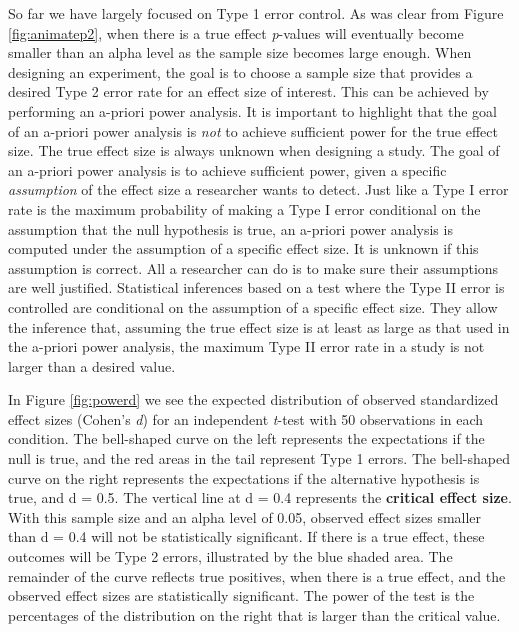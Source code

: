 \documentclass[
  oneside]{krantz}
\begin{document}
So far we have largely focused on Type 1 error control. As was clear from Figure \ref{fig:animatep2}, when there is a true effect \emph{p}-values will eventually become smaller than an alpha level as the sample size becomes large enough. When designing an experiment, the goal is to choose a sample size that provides a desired Type 2 error rate for an effect size of interest. This can be achieved by performing an a-priori power analysis. It is important to highlight that the goal of an a-priori power analysis is \emph{not} to achieve sufficient power for the true effect size. The true effect size is always unknown when designing a study. The goal of an a-priori power analysis is to achieve sufficient power, given a specific \emph{assumption} of the effect size a researcher wants to detect. Just like a Type I error rate is the maximum probability of making a Type I error conditional on the assumption that the null hypothesis is true, an a-priori power analysis is computed under the assumption of a specific effect size. It is unknown if this assumption is correct. All a researcher can do is to make sure their assumptions are well justified. Statistical inferences based on a test where the Type II error is controlled are conditional on the assumption of a specific effect size. They allow the inference that, assuming the true effect size is at least as large as that used in the a-priori power analysis, the maximum Type II error rate in a study is not larger than a desired value.

In Figure \ref{fig:powerd} we see the expected distribution of observed standardized effect sizes (Cohen's \emph{d}) for an independent \emph{t}-test with 50 observations in each condition. The bell-shaped curve on the left represents the expectations if the null is true, and the red areas in the tail represent Type 1 errors. The bell-shaped curve on the right represents the expectations if the alternative hypothesis is true, and d = 0.5. The vertical line at d = 0.4 represents the \textbf{critical effect size}. With this sample size and an alpha level of 0.05, observed effect sizes smaller than d = 0.4 will not be statistically significant. If there is a true effect, these outcomes will be Type 2 errors, illustrated by the blue shaded area. The remainder of the curve reflects true positives, when there is a true effect, and the observed effect sizes are statistically significant. The power of the test is the percentages of the distribution on the right that is larger than the critical value.
\end{document}

